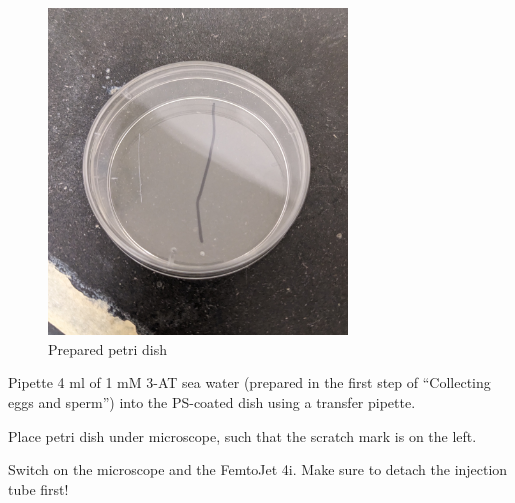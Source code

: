 \documentclass[
  letterpaper,
  DIV=11,
  numbers=noendperiod]{scrartcl}
\begin{document}
\begin{figure}

{\centering \includegraphics[width=3.125in,height=\textheight]{micro_photos/included/petri_dish_prep.jpg}

}

\caption{Prepared petri dish}

\end{figure}

Pipette 4 ml of 1 mM 3-AT sea water (prepared in the first step of
``Collecting eggs and sperm'') into the PS-coated dish using a transfer
pipette.

Place petri dish under microscope, such that the scratch mark is on the
left.

Switch on the microscope and the FemtoJet 4i. Make sure to detach the
injection tube first!
\end{document}
